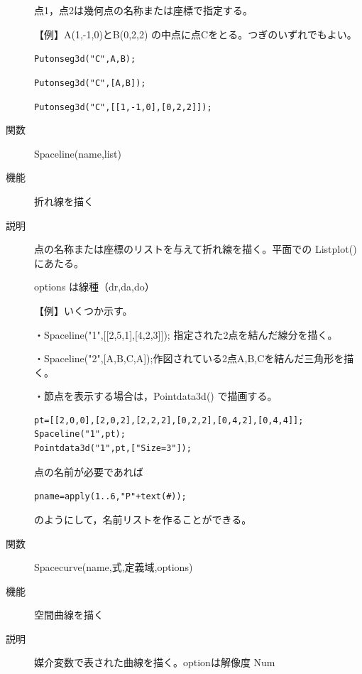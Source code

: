 \documentclass[papersize,a4paper,12pt,uplatex]{jsarticle}
\begin{document}
\begin{description}
点1，点2は幾何点の名称または座標で指定する。

\vspace{\baselineskip}
【例】A(1,-1,0)とB(0,2,2) の中点に点Cをとる。つぎのいずれでもよい。

\verb|Putonseg3d("C",A,B);|

\verb|Putonseg3d("C",[A,B]);|

\verb|Putonseg3d("C",[[1,-1,0],[0,2,2]]);|

\vspace{\baselineskip}

\hypertarget{spaceline}{}
\item[関数]Spaceline(name,list)
\item[機能]折れ線を描く
\item[説明]点の名称または座標のリストを与えて折れ線を描く。平面での Listplot() にあたる。

options は線種（dr,da,do）

\vspace{\baselineskip}
【例】いくつか示す。

・Spaceline("1",[[2,5,1],[4,2,3]]); 指定された2点を結んだ線分を描く。

・Spaceline("2",[A,B,C,A]);作図されている2点A,B,Cを結んだ三角形を描く。

・節点を表示する場合は，Pointdata3d() で描画する。

\begin{verbatim}
pt=[[2,0,0],[2,0,2],[2,2,2],[0,2,2],[0,4,2],[0,4,4]];
Spaceline("1",pt);
Pointdata3d("1",pt,["Size=3"]);
\end{verbatim}

点の名前が必要であれば

\verb|pname=apply(1..6,"P"+text(#));|

のようにして，名前リストを作ることができる。

 \begin{center}  \end{center}

\hypertarget{spacecurve}{}
\item[関数]Spacecurve(name,式,定義域,options)
\item[機能]空間曲線を描く
\item[説明]媒介変数で表された曲線を描く。optionは解像度 Num


\end{description}
\end{document}
